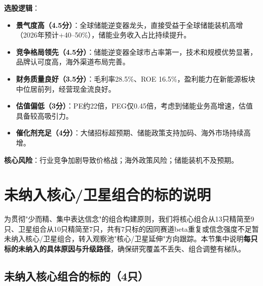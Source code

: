 \textbf{选股逻辑}：
\vspace{0.2em}
\begin{itemize}[leftmargin=2em]
\item \textbf{景气度高（4.5分）}：全球储能逆变器龙头，直接受益于全球储能装机高增（2026年预计+40--50\%），储能业务收入占比持续提升。
\item \textbf{竞争格局领先（4.5分）}：储能逆变器全球市占率第一，技术和规模优势显著，品牌认可度高，海外渠道布局完善。
\item \textbf{财务质量良好（3.5分）}：毛利率28.5\%、ROE 16.5\%，盈利能力在新能源板块中位居前列，经营现金流良好。
\item \textbf{估值偏低（3分）}：PE约22倍，PEG仅0.45倍，考虑到储能业务高增速，估值具备较高吸引力。
\item \textbf{催化剂充足（4分）}：大储招标超预期、储能政策支持加码、海外市场持续高增。
\end{itemize}

\textbf{核心风险}：行业竞争加剧导致价格战；海外政策风险；储能装机不及预期。

\section{未纳入核心/卫星组合的标的说明}

为贯彻"少而精、集中表达信念"的组合构建原则，我们将核心组合从13只精简至9只、卫星组合从10只精简至7只，共有7只标的因同赛道beta重复或信念强度不足暂未纳入核心/卫星组合，转入观察池"核心/卫星延伸"方向跟踪。本节集中说明\textbf{每只标的未纳入的具体原因与升级路径}，确保研究覆盖不丢失、组合调整有梯队。

\subsection{未纳入核心组合的标的（4只）}

